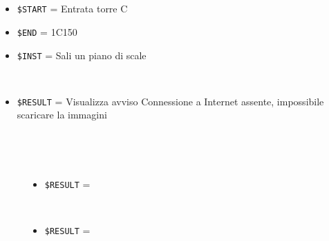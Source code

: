 \documentclass[../../Sperimentazione.tex]{subfiles}
\begin{document}
	
	\newpage	
			\paragraph*{}
			\label{Prova14A.1}	
			\begin{tcolorbox}[fonttitle=\bfseries, 
								adjusted title={\Large Prova 14A.1}, 
								breakable, 
								sharp corners=south,
								colback=white, 
								colframe=white!60!black]
								
				\begin{description}[leftmargin=0.7cm,labelwidth=!]
				
					\item[Input] \ \par 
        				\begin{itemize}
        					\item \verb|$START| = Entrata torre C
        					\item \verb|$END| = 1C150
							\item \verb|$INST| = Sali un piano di scale
        				\end{itemize}
        				
        			\tcbline 
        				
        			\item[Output atteso] \ \par
        				\begin{itemize}
        					\item \verb|$RESULT| = Visualizza avviso Connessione a Internet assente, impossibile scaricare la immagini
        				\end{itemize}

					\tcbline        				
        				
        			\item[Output riscontrato] \ \par
        				\begin{description}
        				
        					\item[\dispositivoA] \ \par
        					\begin{itemize}
        						\item \verb|$RESULT| = \ns
        					\end{itemize}      					
        					
        					\item[\dispositivoB] \ \par
        					\begin{itemize}
        						\item \verb|$RESULT| = \ns
        					\end{itemize}
        					

\end{description}
\end{description}
\end{tcolorbox}
\end{document}

